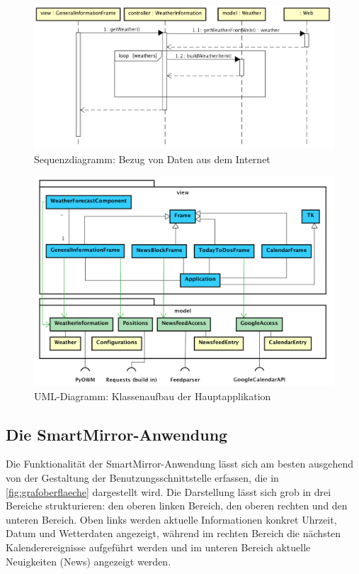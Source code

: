 \begin{figure}
	\centering
	\includegraphics[width=0.7\linewidth]{bilder/sequenceDiagramGettingDataNoBackground}
	\caption{Sequenzdiagramm: Bezug von Daten aus dem Internet}
	\label{fig:sequenzDiagramData}
\end{figure}

\begin{figure}
	\centering
	\includegraphics[width=0.7\linewidth]{bilder/umlDiagramNoBackground}
	\caption[UML-Diagramm: Klassenaufbau der Hauptapplikation]{UML-Diagramm: Klassenaufbau der Hauptapplikation}
	\label{fig:umldiagramClasses}
\end{figure}


\subsection{Die SmartMirror-Anwendung}

Die Funktionalität der SmartMirror-Anwendung lässt sich am besten ausgehend von der Gestaltung der Benutzungsschnittstelle erfassen, die in \autoref{fig:grafoberflaeche} dargestellt wird. Die Darstellung lässt sich grob in drei Bereiche strukturieren: den oberen linken Bereich, den oberen rechten und den unteren Bereich. Oben links werden aktuelle Informationen konkret Uhrzeit, Datum und Wetterdaten angezeigt, während im rechten Bereich die nächsten Kalenderereignisse aufgeführt werden und im unteren Bereich aktuelle Neuigkeiten (News) angezeigt werden.





